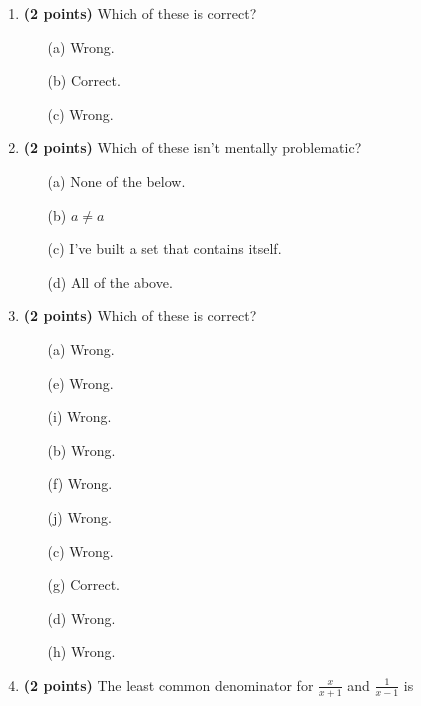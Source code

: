 \documentclass[12pt]{amsart}
\begin{document}
\newpage
\begin{enumerate}
\item {\bf (2 points)} 
 Which of these is correct?

\begin{minipage}[t]{1.0\linewidth}\begin{multicols}{3}\begin{itemize}\item[(a)]  Wrong. \item[(b)]  Correct. \item[(c)]  Wrong. \end{itemize}\end{multicols}\end{minipage} \vfill 
\item {\bf (2 points)} 
 Which of these isn't mentally problematic?

\begin{minipage}[t]{1.0\linewidth}\begin{itemize}\item[(a)]  None of the below.  \item[(b)]  $a \neq a$ \item[(c)]  I've built a set that contains itself. \item[(d)]   All of the above. \end{itemize}\end{minipage} \vfill 
\item {\bf (2 points)} 
 Which of these is correct?

\begin{minipage}[t]{1.0\linewidth}\begin{multicols}{4}\begin{itemize}\item[(a)]  Wrong. \item[(e)]  Wrong. \item[(i)]  Wrong. \item[(b)]  Wrong. \item[(f)]  Wrong. \item[(j)]  Wrong. \item[(c)]  Wrong. \item[(g)]  Correct. \item[] \item[(d)]  Wrong. \item[(h)]  Wrong. \item[] \end{itemize}\end{multicols}\end{minipage} \vfill 
\item {\bf (2 points)} 
 The least common denominator for $\displaystyle \frac{x}{x+1}$ and $\displaystyle \frac{1}{x-1}$ is \vspace{.2cm}


\end{enumerate}
\end{document}
